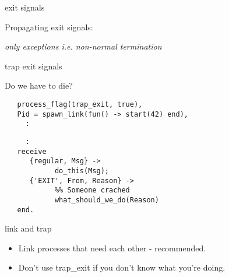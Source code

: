 \begin{frame}[fragile]{exit signals}

Propagating exit signals:


\pause

{\em only exceptions i.e. non-normal termination}

\end{frame}


\begin{frame}[fragile]{trap exit signals}

Do we have to die?

\pause\vspace{10pt}

\begin{verbatim}
   process_flag(trap_exit, true),
   Pid = spawn_link(fun() -> start(42) end),
     :
\end{verbatim}

\pause\vspace{10pt}

\begin{verbatim}
     :
   receive
      {regular, Msg} -> 
            do_this(Msg);
      {'EXIT', From, Reason} ->
            %% Someone crached
            what_should_we_do(Reason)
   end.
\end{verbatim}


\end{frame}

\begin{frame}{link and trap}

\begin{itemize}
\item Link processes that need each other - recommended.
\pause
\item Don't use trap\_exit if you don't know what you're doing.
\end{itemize}

\end{frame}


